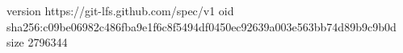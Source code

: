 version https://git-lfs.github.com/spec/v1
oid sha256:c09be06982c486fba9e1f6c8f5494df0450ec92639a003e563bb74d89b9c9b0d
size 2796344
